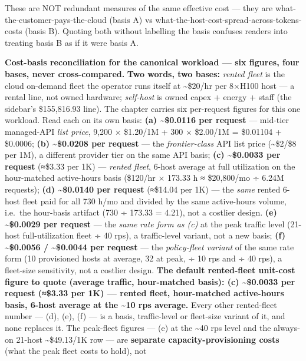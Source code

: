 These are NOT redundant measures of the same effective cost --- they are
what-the-customer-pays-the-cloud (basis A) vs
what-the-host-cost-spread-across-tokens-costs (basis B). Quoting both
without labelling the basis confuses readers into treating basis B as if
it were basis A.

\textbf{Cost-basis reconciliation for the canonical workload --- six
figures, four bases, never cross-compared.} \textbf{Two words, two
bases:} \emph{rented fleet} is the cloud on-demand fleet the operator
runs itself at \textasciitilde\$20/hr per 8×H100 host --- a rental line,
not owned hardware; \emph{self-host} is owned capex + energy + staff
(the sidebar's \$155,816.93 line). The chapter carries six per-request
figures for this one workload. Read each on its own basis: \textbf{(a)
\textasciitilde\$0.0116 per request} --- mid-tier managed-API \emph{list
price}, 9,200 × \$1.20/1M + 300 × \$2.00/1M = \$0.01104 + \$0.0006;
\textbf{(b) \textasciitilde\$0.0208 per request} --- the
\emph{frontier-class} API list price (\textasciitilde\$2/\$8 per 1M), a
different provider tier on the same API basis; \textbf{(c)
\textasciitilde\$0.0033 per request} (≈\$3.33 per 1K) --- \emph{rented
fleet}, 6-host average at full utilization on the hour-matched
active-hours basis (\$120/hr × 173.33 h ≈ \$20,800/mo ÷ 6.24M requests);
\textbf{(d) \textasciitilde\$0.0140 per request} (≈\$14.04 per 1K) ---
the \emph{same} rented 6-host fleet paid for all 730 h/mo and divided by
the same active-hours volume, i.e.~the hour-basis artifact (730 ÷ 173.33
= 4.21), not a costlier design. \textbf{(e) \textasciitilde\$0.0029 per
request} --- the \emph{same rate form as (c)} at the peak traffic level
(21-host full-utilization fleet ÷ 40 rps), a traffic-level variant, not
a new basis; \textbf{(f) \textasciitilde\$0.0056 /
\textasciitilde\$0.0044 per request} --- the \emph{policy-fleet variant}
of the same rate form (10 provisioned hosts at average, 32 at peak, ÷ 10
rps and ÷ 40 rps), a fleet-size sensitivity, not a costlier design.
\textbf{The default rented-fleet unit-cost figure to quote (average
traffic, hour-matched basis): (c) \textasciitilde\$0.0033 per request
(≈\$3.33 per 1K) --- rented fleet, hour-matched active-hours basis,
6-host average at the \textasciitilde10 rps average.} Every other
rented-fleet number --- (d), (e), (f) --- is a basis, traffic-level or
fleet-size variant of it, and none replaces it. The peak-fleet figures
--- (e) at the \textasciitilde40 rps level and the always-on 21-host
\textasciitilde\$49.13/1K row --- are \textbf{separate
capacity-provisioning costs} (what the peak fleet costs to hold), not
